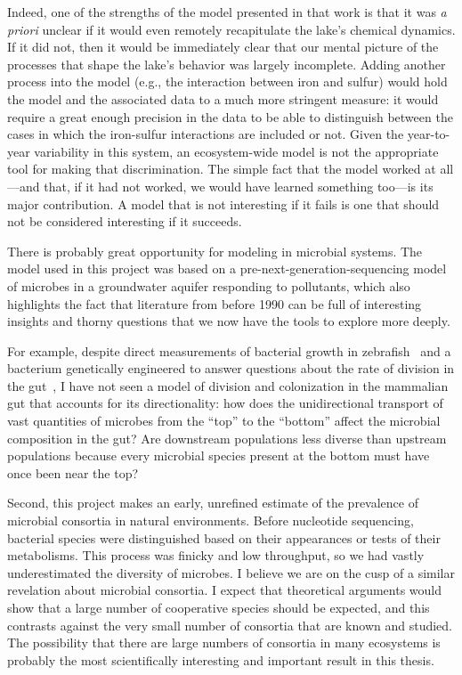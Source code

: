 Indeed, one of the strengths of the model presented in that work is that
it was \textit{a priori} unclear if it would even remotely recapitulate the lake's chemical
dynamics. If it did not, then it would be immediately clear that our mental
picture of the processes that shape the lake's behavior was largely
incomplete. Adding another process into the model (e.g., the interaction
between iron and sulfur) would hold the model and the associated data
to a much more stringent measure: it would require a great enough precision
in the data to be able to distinguish between the cases in which the
iron-sulfur interactions are included or not. Given the year-to-year
variability in this system, an ecosystem-wide model is not the appropriate
tool for making that discrimination. The simple fact that the model
worked at all---and that, if it had not worked, we would have learned
something too---is its major contribution. A model that is not interesting
if it fails is one that should not be considered interesting if it
succeeds.

There is probably great opportunity for modeling in microbial systems.
The model used in this project was based on a pre-next-generation-sequencing
model of microbes in a groundwater aquifer responding to pollutants,
which also highlights the fact that literature from before 1990 can
be full of interesting insights and thorny questions that we now have
the tools to explore more deeply.

For example, despite direct measurements of bacterial growth in
zebrafish~\cite{jemielita_spatial_2014} and a bacterium genetically
engineered to answer questions about the rate of division in the gut~\cite{myrhvold_distributed_2015},
I have not seen a model of division and colonization in the mammalian
gut that accounts for its directionality: how does the unidirectional transport
of vast quantities of microbes from the ``top'' to the ``bottom'' affect
the microbial composition in the gut? Are downstream populations
less diverse than upstream populations because every microbial species
present at the bottom must have once been near the top?

Second, this project makes an early, unrefined estimate of the prevalence
of microbial consortia in natural environments. Before nucleotide sequencing,
bacterial species were distinguished based on their appearances or tests
of their metabolisms. This process was finicky and low throughput, so we
had vastly underestimated the diversity of microbes. I believe we are on
the cusp of a similar revelation about microbial consortia. I expect that
theoretical arguments would show that a large number of cooperative species
should be expected, and this contrasts against the very small number of
consortia that are known and studied. The possibility that there are
large numbers of consortia in many ecosystems is probably the most
scientifically interesting and important result in this thesis.

